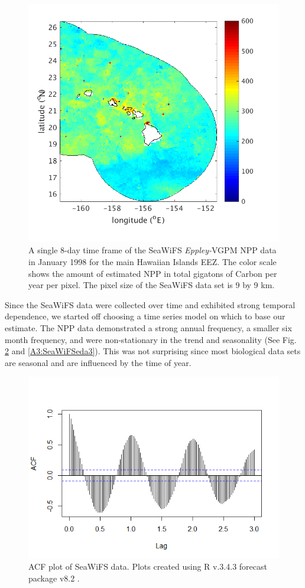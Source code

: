 \documentclass[oneside,12pt,final]{sty/ucthesis-CA2012}
\let\cite\citep                             %
\begin{document}
\begin{mainmatter}
\begin{figure}[H]
     \centering
       \includegraphics[width=.7\textwidth]{fig/SeaWiFSmhi}
    \caption{A single 8-day time frame of the SeaWiFS \textit{Eppley-}VGPM NPP data in January 1998 for the main Hawaiian Islands EEZ. The color scale shows the amount of estimated NPP in total gigatons of Carbon per year per pixel. The pixel size of the SeaWiFS data set is 9 by 9 km.}
    \label{A3:SeaWiFSmhi}
\end{figure}

Since the SeaWiFS data were collected over time and exhibited strong temporal dependence, we started off choosing a time series model on which to base our estimate. The NPP data demonstrated a strong annual frequency, a smaller six month frequency, and were non-stationary in the trend and seasonality (See Fig. \ref{A3:SeaWiFSeda1}  and \ref{A3:SeaWiFSeda3}). This was not surprising since most biological data sets are seasonal and are influenced by the time of year. 

\begin{figure}[H]
     \centering
       \includegraphics[width=.7\textwidth]{fig/seawifs_acf}
    \caption{ACF plot of SeaWiFS data. Plots created using R v.3.4.3 \cite{Rcite} forecast package v8.2 \cite{forecast1, forecast2}.}
    \label{A3:SeaWiFSeda1}
\end{figure}


\end{mainmatter}
\end{document}
